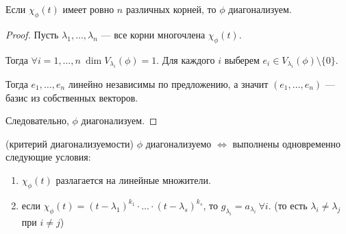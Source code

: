 \begin{corollary}
    Если $\chi_\phi(t)$ имеет ровно $n$ различных корней, то $\phi$ диагонализуем.
\end{corollary}

\begin{proof}
    Пусть $\lambda_1, \dots, \lambda_n$ --- все корни многочлена $\chi_\phi(t)$. 

    Тогда $\forall i = 1, \dots, n \ \dim V_{\lambda_i}(\phi) = 1$. Для каждого $i$ выберем $e_i \in V_{\lambda_i}(\phi) \setminus \{0\}$.

    Тогда $e_1, \dots, e_n$ линейно независимы по предложению, а значит $(e_1, \dots, e_n)$ --- базис из собственных векторов.

    Следовательно, $\phi$ диагонализуем.
\end{proof}

\begin{theorem}{(критерий диагонализуемости)} $\phi$ диагонализуемо $\iff$ выполнены одновременно следующие условия:

    \begin{enumerate}
        \item $\chi_\phi(t)$ разлагается на линейные множители.
        \item если $\chi_\phi(t) = (t - \lambda_1)^{k_1} \cdot \ldots \cdot (t - \lambda_s)^{k_s}$, то $g_{\lambda_i} = a_{\lambda_i} \ \forall i$. (то есть $\lambda_i \neq \lambda_j$ при $i \neq j$)
    \end{enumerate}
\end{theorem}

